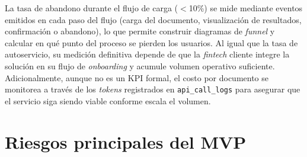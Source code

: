 La tasa de abandono durante el flujo de carga ($<$10\%) se mide mediante eventos emitidos en cada paso del flujo (carga del documento, visualización de resultados, confirmación o abandono), lo que permite construir diagramas de \textit{funnel} y calcular en qué punto del proceso se pierden los usuarios. Al igual que la tasa de autoservicio, su medición definitiva depende de que la \textit{fintech} cliente integre la solución en su flujo de \textit{onboarding} y acumule volumen operativo suficiente. Adicionalmente, aunque no es un KPI formal, el costo por documento se monitorea a través de los \textit{tokens} registrados en \texttt{api\_call\_logs} para asegurar que el servicio siga siendo viable conforme escala el volumen.

\begin{table}[H]
\centering
\caption{Correspondencia entre KPIs del proyecto y métricas instrumentadas en el MVP}
\label{tab:metricas_mvp}
\small
{}
\end{table}


\section{Riesgos principales del MVP}

